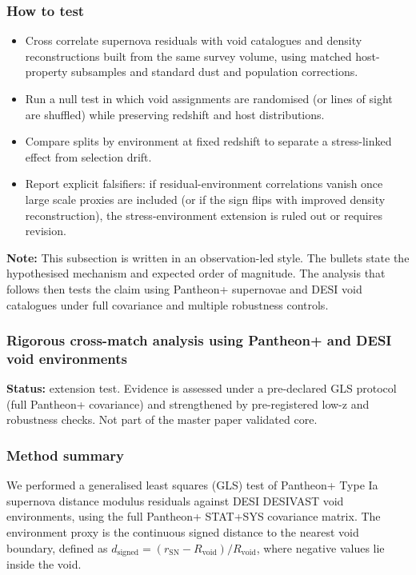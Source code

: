 \documentclass[11pt,a4paper]{article}
\begin{document}
\subsubsection{How to test}
\begin{itemize}
  \item Cross correlate supernova residuals with void catalogues and density reconstructions built from the same survey volume, using matched host-property subsamples and standard dust and population corrections.
  \item Run a null test in which void assignments are randomised (or lines of sight are shuffled) while preserving redshift and host distributions.
  \item Compare splits by environment at fixed redshift to separate a stress-linked effect from selection drift.
  \item Report explicit falsifiers: if residual-environment correlations vanish once large scale proxies are included (or if the sign flips with improved density reconstruction), the stress-environment extension is ruled out or requires revision.
\end{itemize}

\textbf{Note:} This subsection is written in an observation-led style. The bullets state the hypothesised mechanism and expected order of magnitude. The analysis that follows then tests the claim using Pantheon+ supernovae and DESI void catalogues under full covariance and multiple robustness controls.

\subsubsection{Rigorous cross-match analysis using Pantheon+ and DESI void environments}
\begin{mdframed}[linecolor=accent,linewidth=0.5pt,backgroundcolor=callout-bg,leftline=true,rightline=true,topline=true,bottomline=true,innerleftmargin=8pt,innerrightmargin=8pt,innertopmargin=6pt,innerbottommargin=6pt]
\textbf{Status:} extension test. Evidence is assessed under a pre-declared GLS protocol (full Pantheon+ covariance) and strengthened by pre-registered low-z and robustness checks. Not part of the master paper validated core.
\end{mdframed}

\subsubsection{Method summary}
We performed a generalised least squares (GLS) test of Pantheon+ Type Ia supernova distance modulus residuals against DESI DESIVAST void environments,
using the full Pantheon+ STAT+SYS covariance matrix. The environment proxy is the continuous signed distance to the nearest void boundary,
defined as \(d_{\mathrm{signed}} = (r_{\mathrm{SN}} - R_{\mathrm{void}})/R_{\mathrm{void}}\), where negative values lie inside the void.
\end{document}
